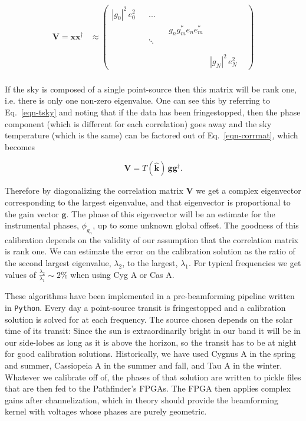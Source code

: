 \begin{align}
\label{eqn-corrmat}
\mathbf{V} = \mathbf{x} \mathbf{x}^\dagger &\approx \begin{pmatrix}
|g_0|^2\, e_0^2 &  & ... & & & \\ 
 &  &  & &  g_n g_m^* e_n e_m^*& \\ 
 &  &  \ddots & & & \\ 
 &  &  &  & & \\
&&&&&&\\
 &  &   &  & &  |g_N|^2 \, e_N^2
\end{pmatrix}
\end{align}
\\

If the sky is composed of a single point-source
then this matrix will be rank one, i.e. there is only one 
non-zero eigenvalue. One can see this by referring to Eq.~\ref{eqn-tsky} 
and noting that if the data has been fringestopped, then the phase 
component (which is different for each correlation) goes away and the 
sky temperature (which is the same) can be factored out of
Eq.~\ref{eqn-corrmat}, which becomes

\begin{equation}
\mathbf{V} = T(\mathbf{\hat{k}}) \, \mathbf{g} \mathbf{g}^\dagger.
\end{equation}

\noindent Therefore by diagonalizing the correlation matrix $\mathbf{V}$ 
we get a complex eigenvector corresponding to the largest 
eigenvalue, and that eigenvector is proportional to the gain vector $\mathbf{g}$. 
The phase of this eigenvector will be an estimate for the instrumental 
phases, $\phi_{g_n}$, up to some unknown global offset. The goodness 
of this calibration depends on the validity of our assumption 
that the correlation matrix is rank one. We can estimate the 
error on the calibration solution as the ratio of the second largest 
eigenvalue, $\lambda_2$, to the largest, $\lambda_1$. For typical 
frequencies we get values of $\frac{\lambda_2}{\lambda_1}\sim2\%$ 
when using Cyg A or Cas A.

These algorithms have been implemented in a pre-beamforming 
pipeline written in {\tt Python}. Every day a point-source transit 
is fringestopped and a calibration solution is solved for 
at each frequency.
The source chosen depends on the solar time of its transit: Since the
sun is extraordinarily bright in our band it will be in our side-lobes 
as long as it is above the horizon,
so the transit has to be 
at night for good calibration solutions. Historically, 
we have used Cygnus A in the spring and summer, Cassiopeia A 
in the summer and fall, and Tau A in the winter. 
Whatever we calibrate off of, the phases of that solution are 
written to pickle files that are then fed to the Pathfinder's FPGAs.
The FPGA then applies complex gains after channelization, which 
in theory should provide the beamforming kernel with voltages 
whose phases are purely geometric. 

